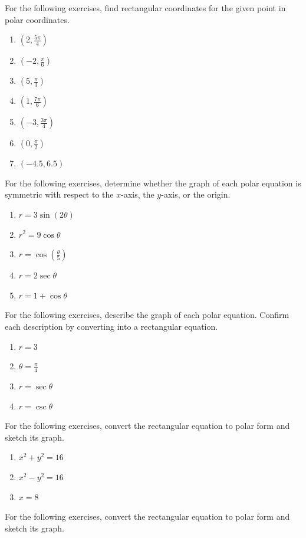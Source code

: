 \documentclass{exercises}
\begin{document}
For the following exercises, find rectangular coordinates for the given point in polar coordinates.

\begin{enumerate}[resume]
\item $(2,\frac{5\pi}{4})$
\item $(-2,\frac{\pi}{6})$
\item $(5,\frac{\pi}{3})$
\item $(1,\frac{7\pi}{6})$
\item $(-3,\frac{3\pi}{4})$
\item $(0,\frac{\pi}{2})$
\item $(-4.5,6.5)$
\end{enumerate}

For the following exercises, determine whether the graph of each polar equation is symmetric with respect to the $x$-axis, the $y$-axis, or the origin.

\begin{enumerate}[resume]
\item $r=3\sin(2\theta)$
\item $r^{2}=9\cos \theta$
\item $r=\cos(\frac{\theta}{5})$
\item $r=2\sec \theta$
\item $r=1+\cos \theta$
\end{enumerate}

For the following exercises, describe the graph of each polar equation. Confirm each description by converting into a rectangular equation.

\begin{enumerate}[resume]
\item $r=3$
\item $\theta=\frac{\pi}{4}$
\item $r=\sec \theta$
\item $r=\csc \theta$
\end{enumerate}

For the following exercises, convert the rectangular equation to polar form and sketch its graph.

\begin{enumerate}[resume]
\item $x^{2}+y^{2}=16$
\item $x^{2}-y^{2}=16$
\item $x=8$
\end{enumerate}

For the following exercises, convert the rectangular equation to polar form and sketch its graph.
\end{document}

